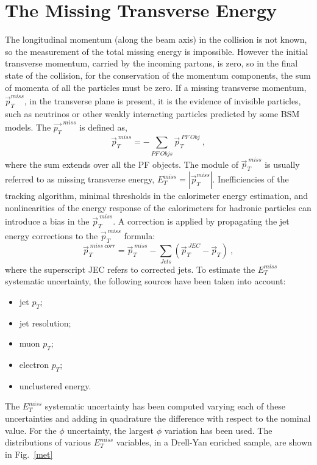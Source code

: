 \section{The Missing Transverse Energy}
The longitudinal momentum (along the beam axis) in the collision is not known, so the measurement of the total missing
energy is impossible.
However the initial transverse momentum, carried by the incoming partons, is zero, so in the final state of the collision, for the conservation of the momentum
components, the sum of momenta of all the particles must be zero.
If a missing transverse momentum, $\vec{p}_T^{miss}$, in the transverse plane is present, it is the evidence of invisible particles, such as neutrinos or other weakly interacting particles predicted by some BSM models.
The $\vec{p_T}^{\: miss}$ is defined as,
\begin{equation}
\vec{p}_T^{\: miss}= -\sum_{PF\: Objs} \vec{p}_T^{\:PF \: Obj} \: ,
\end{equation}
where the sum extends over all the PF objects. The module of $\vec{p}_T^{\: miss}$ is usually referred to as missing transverse energy, $E_T^{miss}=|\vec{p}_T^{miss}|$.
Inefficiencies of the tracking algorithm, minimal thresholds in the calorimeter energy
estimation, and nonlinearities of the energy response of the calorimeters for hadronic particles 
can introduce a bias in the $\vec{p}_T^{\: miss}$. A correction is applied by propagating
the jet energy corrections to the $\vec{p}_T^{\: miss}$ formula:
\begin{equation}
\vec{p}_T^{\:miss \: corr}= \vec{p}_T^{\:miss} -\sum_{Jets}( \vec{p}_T^{\:JEC} -\vec{p}_T) \: ,
\end{equation}
where the superscript JEC refers to corrected jets.
To estimate the $E_T^{miss}$  systematic uncertainty, the following sources have been taken into account:
\begin{itemize}
\item jet $p_T$;
\item jet resolution;
\item muon  $p_T$;
\item electron $p_T$;
\item unclustered energy.
\end{itemize}
The $E_T^{miss}$ systematic uncertainty has been computed varying each of these uncertainties and adding in quadrature the
difference with respect to the nominal value. For the $\phi$ uncertainty, the largest
$\phi$ variation has been used.
The distributions of various  $E_T^{miss}$ variables, in a Drell-Yan enriched sample, are shown in Fig.~\ref{met}
